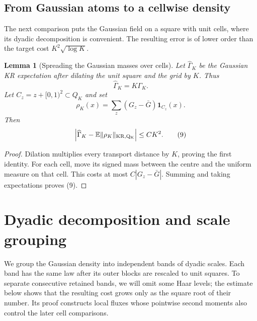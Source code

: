 \documentclass{aomart}
\newtheorem{lemma}[theorem]{Lemma}
\theoremstyle{definition}
\newcommand{\1}{\mathbf 1}
\begin{document}
\subsection{From Gaussian atoms to a cellwise density}

The next comparison puts the Gaussian field on a square with unit cells,
where its dyadic decomposition is convenient.  The resulting error is of
lower order than the target cost $K^2\sqrt{\log K}$.

\begin{lemma}[Spreading the Gaussian masses over cells]\label{lem:atom-to-cell}
Let $\widehat\Gamma_ K$ be the Gaussian KR expectation after dilating the
unit square and the grid by $K$. Thus
\begin{equation*}
\widehat\Gamma_ K=K\Gamma_ K.
\end{equation*}
Let $C_ z=z+[0,1)^2\subset Q_ K$ and set
\begin{equation*}
\rho_ K(x)=\sum_ z(G_ z-\bar G)\mathbf1_ {C_ z}(x).
\end{equation*}
Then
\begin{equation}
\left|\widehat\Gamma_ K-
\mathbb E\|\rho_ K\|_ {\rm KR,Q_ K}\right|\leq CK^2.
\tag{9}
\end{equation}

\end{lemma}

\begin{proof}
Dilation multiplies every transport distance by $K$, proving the first
identity. For each cell, move its signed mass between the centre and the
uniform measure on that cell. This costs at most
$C|G_ z-\bar G|$. Summing and taking expectations proves (9).

\end{proof}

\section{Dyadic decomposition and scale grouping}\label{sec:dyadic}

We group the Gaussian density into independent bands of dyadic scales.
Each band has the same law after its outer blocks are rescaled to unit
squares.  To separate consecutive retained bands, we will omit some Haar
levels; the estimate below shows that the resulting cost grows only as
the square root of their number.  Its proof constructs local fluxes whose
pointwise second moments also control the later cell comparisons.
\end{document}
